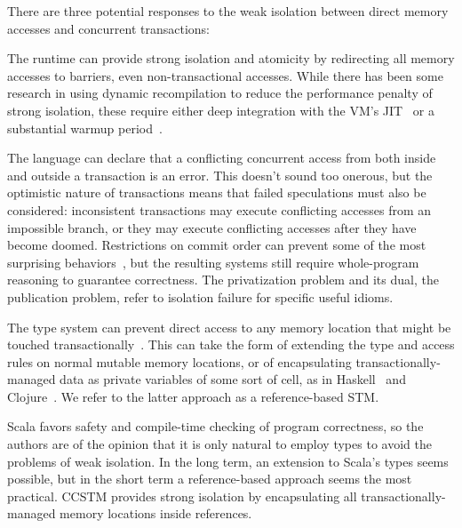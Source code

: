There are three potential responses to the weak isolation between direct memory
accesses and concurrent transactions:
\begin{packed_itemize}

\item The runtime can provide strong isolation and atomicity by redirecting
all memory accesses to barriers, even non-transactional accesses.
While there has been some research in using dynamic recompilation
to reduce the performance penalty of strong isolation, these require
either deep integration with the VM's JIT~\cite{schneider08dynamic}
or a substantial warmup period~\cite{bronson09dbo}.

\item The language can declare that a conflicting concurrent access
from both inside and outside a transaction is an error.  This doesn't
sound too onerous, but the optimistic nature of transactions means that
failed speculations must also be considered: inconsistent transactions
may execute conflicting accesses from an impossible branch, or they
may execute conflicting accesses after they have become doomed.
Restrictions on commit order can prevent some of the most surprising
behaviors~\cite{sgla08}, but the resulting systems still require
whole-program reasoning to guarantee correctness.  The privatization
problem and its dual, the publication problem, refer to isolation failure
for specific useful idioms.

\item The type system can prevent direct access to any memory
location that might be touched transactionally~\cite{moore08semantics}.
This can take the form of extending the type and access rules on normal
mutable memory locations, or of encapsulating transactionally-managed
data as private variables of some sort of cell, as in Haskell~\cite{harris05composable}
and Clojure~\cite{hickey08clojure}.  We refer to the latter approach as
a reference-based STM.

\end{packed_itemize}

Scala favors safety and compile-time checking of program correctness,
so the authors are of the opinion that it is only natural to employ types
to avoid the problems of weak isolation.  In the long term, an extension
to Scala's types seems possible, but in the short term a reference-based
approach seems the most practical.  CCSTM provides strong isolation by
encapsulating all transactionally-managed memory locations inside 
references.

